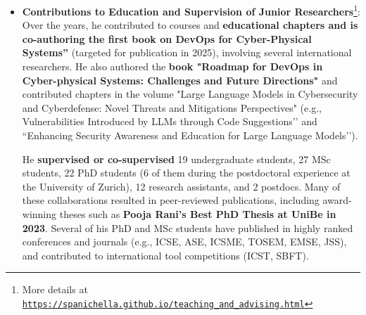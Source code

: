\documentclass[11pt]{article}
\providecommand*\url[1]{\href{#1}{#1}}
\renewcommand*\url[1]{\href{#1}{\texttt{#1}}}
\begin{document}
\begin{itemize}
  \vspace{-2mm}
  \item 
  \textbf{Contributions to Education and Supervision of Junior Researchers}\footnote{More details at \url{https://spanichella.github.io/teaching\_and\_advising.html}}:  
Over the years, he contributed to courses and \textbf{educational chapters and is co-authoring the first book on DevOps for Cyber-Physical Systems''} (targeted for publication in 2025), involving several international researchers. He also authored the \textbf{book "Roadmap for DevOps in Cyber-physical Systems: Challenges and Future Directions"} and contributed chapters in the volume "Large Language Models in Cybersecurity and Cyberdefense: Novel Threats and Mitigations Perspectives" (e.g., Vulnerabilities Introduced by LLMs through Code Suggestions’’ and ``Enhancing Security Awareness and Education for Large Language Models’’). 

He \textbf{supervised or co-supervised} 19 undergraduate students, 27 MSc students, 22 PhD students (6 of them during the postdoctoral experience at the University of Zurich), 12 research assistants, and 2 postdocs. Many of these collaborations resulted in peer-reviewed publications, including award-winning theses such as \textbf{Pooja Rani’s Best PhD Thesis at UniBe in 2023}. Several of his PhD and MSc students have published in highly ranked conferences and journals (e.g., ICSE, ASE, ICSME, TOSEM, EMSE, JSS), and contributed to international tool competitions (ICST, SBFT). 


\end{itemize}
\end{document}
